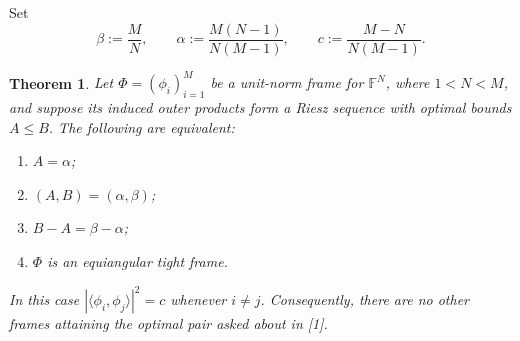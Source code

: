 \documentclass[11pt]{article}
\newtheorem{theorem}{Theorem}
\newcommand{\F}{\mathbb F}
\newcommand{\ip}[2]{\langle #1,#2\rangle}
\begin{document}
Set
\[
  \beta:=\frac MN,
  \qquad
  \alpha:=\frac{M(N-1)}{N(M-1)},
  \qquad
  c:=\frac{M-N}{N(M-1)}.
\]

\begin{theorem}\label{thm:main}
Let $\Phi=(\phi_i)_{i=1}^M$ be a unit-norm frame for $\F^N$, where
$1<N<M$, and suppose its induced outer products form a Riesz sequence with
optimal bounds $A\leq B$.  The following are equivalent:
\begin{enumerate}
  \item $A=\alpha$;
  \item $(A,B)=(\alpha,\beta)$;
  \item $B-A=\beta-\alpha$;
  \item $\Phi$ is an equiangular tight frame.
\end{enumerate}
In this case $|\ip{\phi_i}{\phi_j}|^2=c$ whenever $i\ne j$.
Consequently, there are no other frames attaining the optimal pair asked
about in [1].
\end{theorem}
\end{document}
